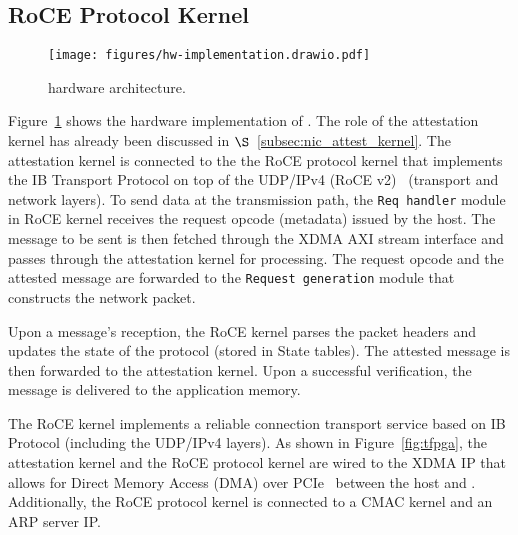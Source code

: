 \subsection{RoCE Protocol Kernel}
\label{subsec:roce_protocol_kernel}

\begin{figure}[t!]
    \centering
    \texttt{[image: figures/hw-implementation.drawio.pdf]}
    \caption{\projecttitle{} hardware architecture.}
     \label{fig:tfpga}\label{fig:tRDMA}
\end{figure}


 Figure~\ref{fig:tRDMA} shows the hardware implementation of \projecttitle{}.  The role of the attestation kernel has already been discussed in $\S$~\ref{subsec:nic_attest_kernel}. The attestation kernel is connected to the the RoCE protocol kernel that implements the IB Transport Protocol on top of the UDP/IPv4 (RoCE v2)~\cite{infiniband} (transport and network layers).  To send data at the transmission path, the {\tt Req handler} module in RoCE kernel receives the request opcode (metadata) issued by the host. The message to be sent is then fetched through the XDMA AXI stream interface and passes through the attestation kernel for processing. The request opcode and the attested message are forwarded to the {\tt Request generation} module that constructs the network packet. %

Upon a message's reception, the RoCE kernel parses the packet headers and updates the state of the protocol (stored in State tables). The attested message is then forwarded to the attestation kernel. Upon a successful verification, the message is delivered to the application memory.

  The RoCE kernel implements a reliable connection transport service based on IB Protocol (including the UDP/IPv4 layers).  As shown in Figure~\ref{fig:tfpga}, the attestation kernel and the RoCE protocol kernel are wired to the XDMA IP that allows for Direct Memory Access (DMA) over PCIe~\cite{Sidler2019InNetworkDP, fpga_dma} between the host and \projecttitle{}. Additionally, the RoCE protocol kernel is connected to a CMAC kernel and an ARP server IP. 

